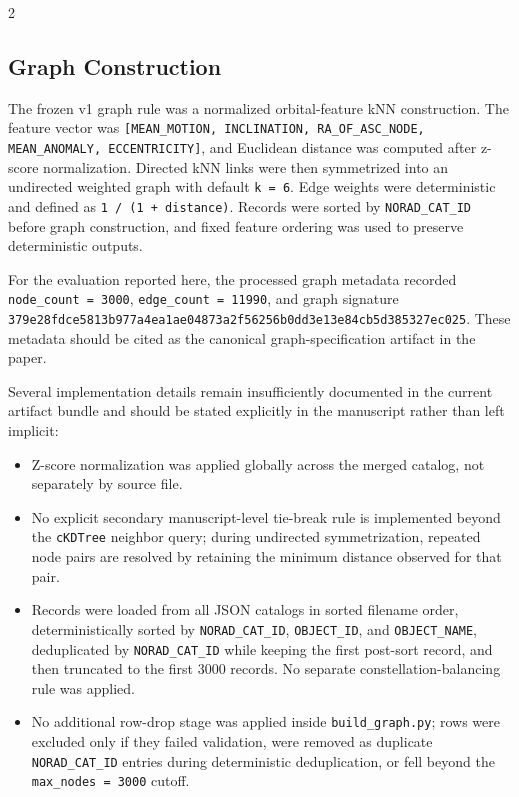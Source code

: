 \documentclass[fleqn,10pt,letterpaper]{article}
\begin{document}
\begin{multicols}{2}
\subsection{Graph Construction}

The frozen v1 graph rule was a normalized orbital-feature kNN construction. The feature vector was
\texttt{[MEAN\_MOTION, INCLINATION, RA\_OF\_ASC\_NODE, MEAN\_ANOMALY, ECCENTRICITY]}, and Euclidean distance was computed after z-score normalization. Directed kNN links were then symmetrized into an undirected weighted graph with default \texttt{k = 6}. Edge weights were deterministic and defined as \texttt{1 / (1 + distance)}. Records were sorted by \texttt{NORAD\_CAT\_ID} before graph construction, and fixed feature ordering was used to preserve deterministic outputs.

For the evaluation reported here, the processed graph metadata recorded \texttt{node\_count = 3000}, \texttt{edge\_count = 11990}, and graph signature \texttt{379e28fdce5813b977a4ea1ae04873a2f56256b0dd3e13e84cb5d385327ec025}. These metadata should be cited as the canonical graph-specification artifact in the paper.

Several implementation details remain insufficiently documented in the current artifact bundle and should be stated explicitly in the manuscript rather than left implicit:

\begin{itemize}
\item Z-score normalization was applied globally across the merged catalog, not separately by source file.
\item No explicit secondary manuscript-level tie-break rule is implemented beyond the \texttt{cKDTree} neighbor query; during undirected symmetrization, repeated node pairs are resolved by retaining the minimum distance observed for that pair.
\item Records were loaded from all JSON catalogs in sorted filename order, deterministically sorted by \texttt{NORAD\_CAT\_ID}, \texttt{OBJECT\_ID}, and \texttt{OBJECT\_NAME}, deduplicated by \texttt{NORAD\_CAT\_ID} while keeping the first post-sort record, and then truncated to the first 3000 records. No separate constellation-balancing rule was applied.
\item No additional row-drop stage was applied inside \texttt{build\_graph.py}; rows were excluded only if they failed validation, were removed as duplicate \texttt{NORAD\_CAT\_ID} entries during deterministic deduplication, or fell beyond the \texttt{max\_nodes = 3000} cutoff.
\end{itemize}


\end{multicols}
\end{document}

